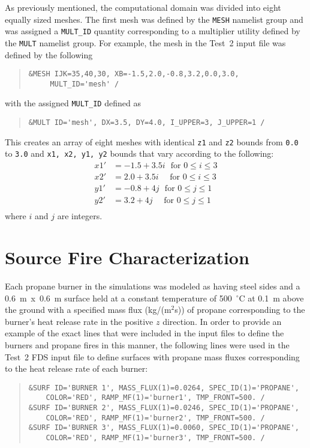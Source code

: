 As previously mentioned, the computational domain was divided into eight equally sized meshes. The first mesh was defined by the \verb|MESH| namelist group and was assigned a \verb|MULT_ID| quantity corresponding to a multiplier utility defined by the \verb|MULT| namelist group. For example, the mesh in the Test~2 input file was defined by the following
\begin{quote}
\begin{verbatim}
&MESH IJK=35,40,30, XB=-1.5,2.0,-0.8,3.2,0.0,3.0, 
     MULT_ID='mesh' / 
\end{verbatim}
\end{quote}
with the assigned \verb|MULT_ID| defined as 
\begin{quote}
\begin{verbatim}
&MULT ID='mesh', DX=3.5, DY=4.0, I_UPPER=3, J_UPPER=1 /
\end{verbatim}
\end{quote}
This creates an array of eight meshes with identical \verb|z1| and \verb|z2| bounds from \verb|0.0| to \verb|3.0| and \verb|x1, x2, y1, y2| bounds that vary according to the following:
\begin{equation*}
\begin{split}
	x1' &= -1.5+3.5i \textrm{~~for~} 0 \leq i \leq 3 \\
	x2' &= 2.0+3.5i \textrm{~~~~for~} 0 \leq i \leq 3 \\
	y1' &= -0.8+4j \textrm{~~for~} 0 \leq j \leq 1 \\
	y2' &= 3.2+4j \textrm{~~~~for~} 0 \leq j \leq 1 \\
\end{split}
\end{equation*}
where $i$ and $j$ are integers.

\section{Source Fire Characterization}
Each propane burner in the simulations was modeled as having steel sides and a 0.6~m~x~0.6~m surface held at a constant temperature of 500~$^\circ$C at 0.1~m above the ground with a specified mass flux (kg/(m$^2$s)) of propane corresponding to the burner's heat release rate in the positive $z$ direction. In order to provide an example of the exact lines that were included in the input files to define the burners and propane fires in this manner, the following lines were used in the Test~2 FDS input file to define surfaces with propane mass fluxes corresponding to the heat release rate of each burner: 
\begin{quote}
\begin{verbatim}
&SURF ID='BURNER 1', MASS_FLUX(1)=0.0264, SPEC_ID(1)='PROPANE', 
    COLOR='RED', RAMP_MF(1)='burner1', TMP_FRONT=500. /
&SURF ID='BURNER 2', MASS_FLUX(1)=0.0246, SPEC_ID(1)='PROPANE', 
    COLOR='RED', RAMP_MF(1)='burner2', TMP_FRONT=500. /
&SURF ID='BURNER 3', MASS_FLUX(1)=0.0060, SPEC_ID(1)='PROPANE', 
    COLOR='RED', RAMP_MF(1)='burner3', TMP_FRONT=500. /
\end{verbatim}
\end{quote}

